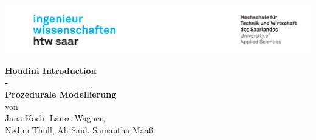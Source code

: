 \begin{titlepage}
	
	\linespread{1.5}
	
	\includegraphics[width=\linewidth]{graphics/htw_logo}
	
	\begin{center}
		\large
		\hfill
		\vfill
		\Large{\bfseries{\textcolor{rosa}{Houdini Introduction\\ - \\ Prozedurale Modellierung}}}
		\\
		\large
		von \\
		Jana Koch, Laura Wagner, \\ 
		Nedim Thull, Ali Said, Samantha Maaß
		
	\end{center}
	
	\vfill
	
	
	\vfill
	
	
	
	
	\vfill
\end{titlepage}
